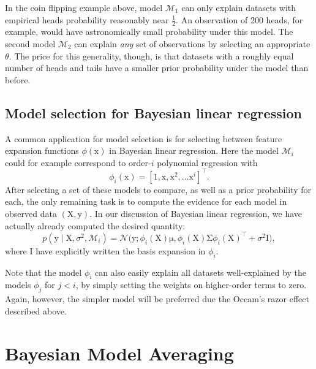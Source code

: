\documentclass{article}
\newcommand{\given}{\mid}
\newcommand{\mc}[1]{\mathcal{#1}}
\newcommand{\model}{\mc{M}}
\newcommand{\trans}{^\top}
\newcommand{\mat}[1]{\bm{\mathrm{#1}}}
\renewcommand{\vec}[1]{\bm{\mathrm{#1}}}
\begin{document}
In the coin flipping example above, model $\model_1$ can only explain
datasets with empirical heads probability reasonably near
$\frac{1}{2}$.  An observation of 200 heads, for example, would have
astronomically small probability under this model.  The second model
$\model_2$ can explain \emph{any} set of observations by selecting an
appropriate $\theta$.  The price for this generality, though, is that
datasets with a roughly equal number of heads and tails have a smaller
prior probability under the model than before.

\subsection*{Model selection for Bayesian linear regression}

A common application for model selection is for selecting between
feature expansion functions $\phi(\vec{x})$ in Bayesian linear
regression.  Here the model $\model_i$ could for example correspond
to order-$i$ polynomial regression with
\begin{equation*}
  \phi_i(\vec{x})
  =
  [1, \vec{x}, \vec{x}^2, \dotsc \vec{x}^i]\trans.
\end{equation*}
After selecting a set of these models to compare, as well as a prior
probability for each, the only remaining task is to compute the
evidence for each model in observed data $(\mat{X}, \vec{y})$.  In our
discussion of Bayesian linear regression, we have actually already
computed the desired quantity:
\begin{equation*}
  p(\vec{y} \given \mat{X}, \sigma^2, \model_i)
  =
  \mc{N}\bigl(\vec{y};
  \phi_i(\mat{X})\vec{\mu},
  \phi_i(\mat{X})\mat{\Sigma}\phi_i(\mat{X})\trans + \sigma^2\mat{I}\bigr),
\end{equation*}
where I have explicitly written the basis expansion in $\phi_i$.

Note that the model $\phi_i$ can also easily explain all datasets
well-explained by the models $\phi_j$ for $j < i$, by simply setting
the weights on higher-order terms to zero.  Again, however, the
simpler model will be preferred due the Occam's razor effect described
above.

\section*{Bayesian Model Averaging}
\end{document}

